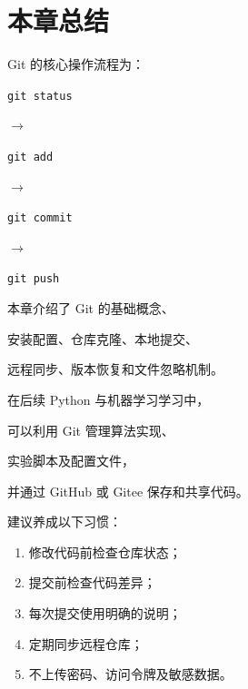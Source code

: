 




\section{本章总结}



Git 的核心操作流程为：



\begin{center}

\texttt{git status}

$\longrightarrow$

\texttt{git add}

$\longrightarrow$

\texttt{git commit}

$\longrightarrow$

\texttt{git push}

\end{center}



本章介绍了 Git 的基础概念、

安装配置、仓库克隆、本地提交、

远程同步、版本恢复和文件忽略机制。



在后续 Python 与机器学习学习中，

可以利用 Git 管理算法实现、

实验脚本及配置文件，

并通过 GitHub 或 Gitee 保存和共享代码。



建议养成以下习惯：



\begin{enumerate}

    \item 修改代码前检查仓库状态；

    \item 提交前检查代码差异；

    \item 每次提交使用明确的说明；

    \item 定期同步远程仓库；

    \item 不上传密码、访问令牌及敏感数据。

\end{enumerate}
